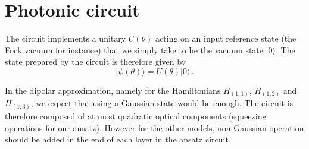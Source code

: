 \documentclass[reprint, amsmath, amssymb, aps]{revtex4-2}
\begin{document}
\section{Photonic circuit}

    The circuit implements a unitary $U(\theta)$ acting on an input reference state (the Fock vacuum for instance) that we simply take to be the vacuum state $|0\rangle$. The state prepared by the circuit is therefore given by
    \begin{equation}
        |\psi(\theta)\rangle = U(\theta)|0\rangle\,.
    \end{equation}

    In the dipolar approximation, namely for the Hamiltonians $H_{(1,1)}$, $H_{(1,2)}$ and $H_{(1,3)}$, we expect that using a Gaussian state would be enough. The circuit is therefore composed of at most quadratic optical components (squeezing operations for our ansatz). However for the other models,  non-Gaussian operation should be added in the end of each layer in the ansatz circuit.
\end{document}
